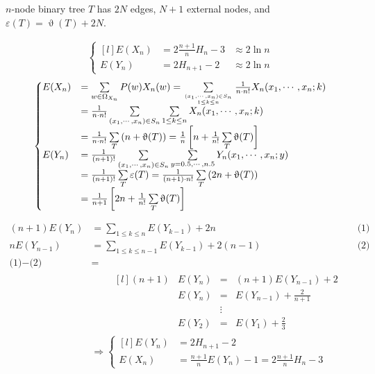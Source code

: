 \documentclass[12pt,a4paper,oneside]{report}
\begin{document}
\begin{theorem}
$n$-node binary tree $T$ has $2N$ edges, $N+1$ external nodes, and $\varepsilon(T)=\upvartheta(T)+2N$. 
\end{theorem}

\begin{theorem}
\begin{align*}
	\left\{\begin{matrix*}[l]
		E(X_n) &= 2 \frac{n+1}{n} H_n - 3 &\approx 2 \ln n \\
		E(Y_n) &= 2 H_{n+1} - 2 &\approx 2 \ln n
	\end{matrix*}\right.
\end{align*}
\begin{align*}
	\left\{\begin{matrix*}[l]
		E(X_n) 
			&= \sum\limits_{w \in \Omega_{X_n} } P(w) X_n(w) 
				= \sum\limits_{(x_1, \cdots, x_n) \in S_n \atop 1 \le k \le n} 
					\frac{1}{n \cdot n!} X_n (x_1, \cdots, x_n ; k) \\
			&= \frac{1}{n \cdot n!} 
				\sum\limits_{(x_1, \cdots, x_n) \in S_n} \sum\limits_{1 \le k \le n} 
					X_n (x_1, \cdots, x_n ; k) \\
			&= \frac{1}{n \cdot n!} \sum\limits_{T} \left(n + \upvartheta(T) \right) 
				= \frac{1}{n} 
					\left[ n + \frac{1}{n!} \sum\limits_{T} \upvartheta(T)\right]\\
		E(Y_n) 
			&= \frac{1}{(n+1)!} \sum\limits_{(x_1, \cdots, x_n) \in S_n}
					\sum\limits_{y = 0.5, \cdots, n.5} Y_n(x_1 , \cdots, x_n ; y) \\
			&= \frac{1}{(n+1)!} \sum\limits_{T} \varepsilon(T) 
				= \frac{1}{(n+1) \cdot n!} \sum\limits_{T} \left(2n + \upvartheta(T)\right) \\
			&= \frac{1}{n+1} \left[2n + \frac{1}{n!} \sum\limits_{T} \upvartheta(T)\right]
	\end{matrix*}\right.
\end{align*}
\end{theorem}

\begin{align*}
	(n+1) E(Y_n) &= \sum\limits_{1 \le k \le n} E(Y_{k-1}) + 2n 
		&& \text{(1)} \\
	n E(Y_{n-1}) &= \sum\limits_{1 \le k \le n-1} E(Y_{k-1}) + 2(n-1)
		&& \text{(2)} \\
	\text{(1)} - \text{(2)} &=\\
		& \qquad
		\begin{matrix*}[l]
		 	(n+1) &E(Y_n) &=& (n+1) E(Y_{n-1}) + 2 \\
			&E(Y_n) &=& E(Y_{n-1}) + \frac{2}{n+1} \\
			& & \vdots &\\
			&E(Y_2) &=& E(Y_1) + \frac{2}{3}
		\end{matrix*} \\
	&\Rightarrow
		\left\{\begin{matrix*}[l]
			E(Y_n) &= 2 H_{n+1} - 2 \\
			E(X_n) &= \frac{n+1}{n} E(Y_{n}) - 1 = 2 \frac{n+1}{n} H_n - 3
		\end{matrix*}\right.
\end{align*}
\end{document}
